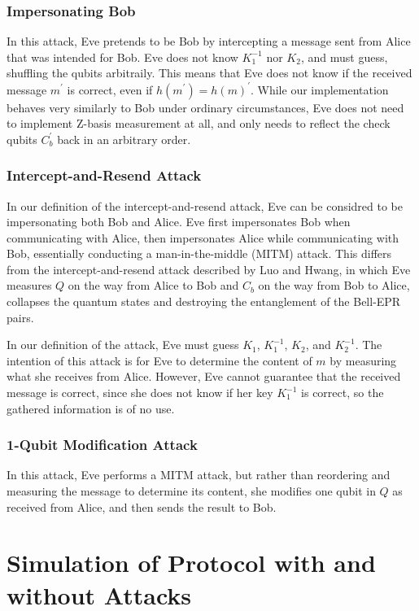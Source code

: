 \documentclass[conference]{IEEEtran}
\begin{document}
\subsubsection{Impersonating Bob}

In this attack, Eve pretends to be Bob by intercepting a message sent from Alice that was
intended for Bob. Eve does not know $K_{1}^{-1}$ nor $K_{2}$, and must guess, shuffling the
qubits arbitraily. This means that Eve does not know if the received message $m^{\prime}$ is correct, even
if $h(m^{\prime}) = h(m)^{\prime}$. While our implementation behaves very similarly to Bob
under ordinary circumstances, Eve does not need to implement Z-basis measurement at all, and only needs
to reflect the check qubits $C_{b}^{\prime}$ back in an arbitrary order.

\subsubsection{Intercept-and-Resend Attack}

In our definition of the intercept-and-resend attack, Eve can be considred to
be impersonating both Bob and Alice. 
Eve first impersonates Bob when communicating with Alice, then impersonates
Alice while communicating with Bob, essentially conducting a man-in-the-middle (MITM) attack.
This differs from the intercept-and-resend attack described by Luo and Hwang, in which Eve measures $Q$
on the way from Alice to Bob and $C_{b}$ on the way from Bob to Alice, collapses the quantum
states and destroying the entanglement of the Bell-EPR pairs.

In our definition of the attack, Eve must guess $K_{1}$, $K_{1}^{-1}$, $K_{2}$, and $K_{2}^{-1}$.
The intention of this attack is for Eve to determine the content of $m$ by measuring what
she receives from Alice. However, Eve cannot guarantee that the received message is correct, since
she does not know if her key $K_{1}^{-1}$ is correct, so the gathered information is of no use.

\subsubsection{1-Qubit Modification Attack}

In this attack, Eve performs a MITM attack, but
rather than reordering and measuring the message to determine its content,
she modifies one qubit in $Q$ as received from Alice, and then sends the result to Bob.

\section{Simulation of Protocol with and without Attacks}
\end{document}
